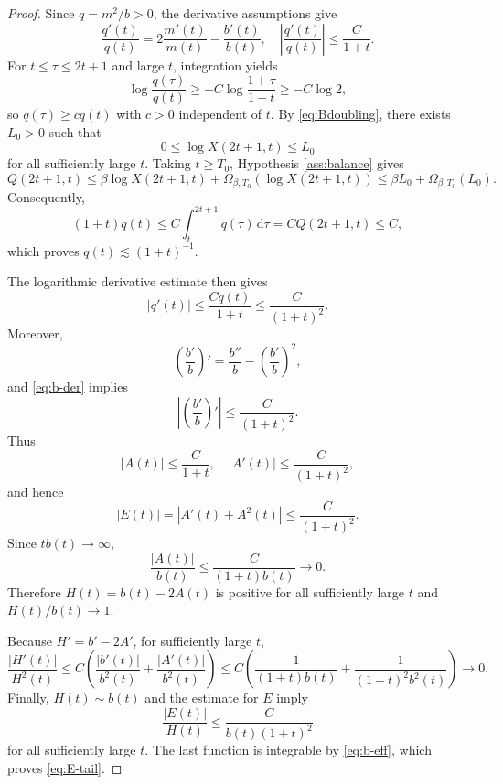 \documentclass[10pt,a4paper]{amsart}
\begin{document}
	\begin{proof}
		Since $q=m^2/b>0$, the derivative assumptions give
		$$
		\frac{q'(t)}{q(t)}
		=2\frac{m'(t)}{m(t)}-\frac{b'(t)}{b(t)},
		\quad
		\left|\frac{q'(t)}{q(t)}\right|\leq\frac{C}{1+t}.
		$$
		For $t\leq\tau\leq2t+1$ and large $t$, integration yields
		$$
		\log\frac{q(\tau)}{q(t)}
		\geq-C\log\frac{1+\tau}{1+t}
		\geq-C\log2,
		$$
		so $q(\tau)\geq c q(t)$ with $c>0$ independent of $t$. By \eqref{eq:Bdoubling}, there exists $L_0>0$ such that
		$$
		0\leq\log X(2t+1,t)\leq L_0
		$$
		for all sufficiently large $t$. Taking $t\geq T_0$, Hypothesis \ref{ass:balance} gives
		$$
		Q(2t+1,t)
		\leq\beta\log X(2t+1,t)
		+\Omega_{\beta,T_0}(\log X(2t+1,t))
		\leq \beta L_0+\Omega_{\beta,T_0}(L_0).
		$$
		Consequently,
		$$
		(1+t)q(t)
		\leq C\int_t^{2t+1}q(\tau)\,\mathrm{d}\tau
		=C Q(2t+1,t)\leq C,
		$$
		which proves $q(t)\lesssim(1+t)^{-1}$.
		
		The logarithmic derivative estimate then gives
		$$
		|q'(t)|\leq\frac{Cq(t)}{1+t}\leq\frac{C}{(1+t)^2}.
		$$
		Moreover,
		$$
		\left(\frac{b'}{b}\right)'
		=\frac{b''}{b}-\left(\frac{b'}{b}\right)^2,
		$$
		and \eqref{eq:b-der} implies
		$$
		\left|\left(\frac{b'}{b}\right)'\right|\leq\frac{C}{(1+t)^2}.
		$$
		Thus
		$$
		|A(t)|\leq\frac{C}{1+t},
		\quad
		|A'(t)|\leq\frac{C}{(1+t)^2},
		$$
		and hence
		$$
		|E(t)|=|A'(t)+A^2(t)|\leq\frac{C}{(1+t)^2}.
		$$
		Since $tb(t)\to\infty$,
		$$
		\frac{|A(t)|}{b(t)}\leq\frac{C}{(1+t)b(t)}\longrightarrow0.
		$$
		Therefore $H(t)=b(t)-2A(t)$ is positive for all sufficiently large $t$ and $H(t)/b(t)\to1$.
		
		Because $H'=b'-2A'$, for sufficiently large $t$,
		$$
		\frac{|H'(t)|}{H^2(t)}
		\leq C\left(
		\frac{|b'(t)|}{b^2(t)}+\frac{|A'(t)|}{b^2(t)}
		\right)
		\leq C\left(
		\frac{1}{(1+t)b(t)}+\frac{1}{(1+t)^2b^2(t)}
		\right)\longrightarrow0.
		$$
		Finally, $H(t)\sim b(t)$ and the estimate for $E$ imply
		$$
		\frac{|E(t)|}{H(t)}\leq\frac{C}{b(t)(1+t)^2}
		$$
		for all sufficiently large $t$. The last function is integrable by \eqref{eq:b-eff}, which proves \eqref{eq:E-tail}.
	\end{proof}
\end{document}
